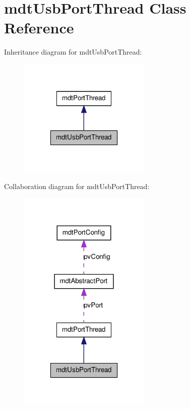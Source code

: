 \hypertarget{classmdt_usb_port_thread}{
\section{mdtUsbPortThread Class Reference}
\label{classmdt_usb_port_thread}
}


Inheritance diagram for mdtUsbPortThread:\nopagebreak
\begin{figure}[H]
\begin{center}
\leavevmode
\includegraphics[width=178pt]{classmdt_usb_port_thread__inherit__graph}
\end{center}
\end{figure}


Collaboration diagram for mdtUsbPortThread:\nopagebreak
\begin{figure}[H]
\begin{center}
\leavevmode
\includegraphics[width=178pt]{classmdt_usb_port_thread__coll__graph}
\end{center}
\end{figure}

